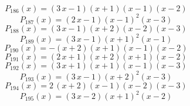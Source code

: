 \subitem \begin{dmath*}P_{186}(x) = {\left(3 \, x - 1\right)} {\left(x + 1\right)} {\left(x - 1\right)} {\left(x - 2\right)} \end{dmath*}\vspace{-1.2cm}
\subitem \begin{dmath*}P_{187}(x) = {\left(2 \, x - 1\right)} {\left(x - 1\right)}^{2} {\left(x - 3\right)} \end{dmath*}\vspace{-1.2cm}
\subitem \begin{dmath*}P_{188}(x) = {\left(3 \, x - 1\right)} {\left(x + 2\right)} {\left(x - 2\right)} {\left(x - 3\right)} \end{dmath*}\vspace{-1.2cm}
\subitem \begin{dmath*}P_{189}(x) = {\left(3 \, x - 1\right)} {\left(x + 1\right)}^{2} {\left(x - 1\right)} \end{dmath*}\vspace{-1.2cm}
\subitem \begin{dmath*}P_{190}(x) = -{\left(x + 2\right)} {\left(x + 1\right)} {\left(x - 1\right)} {\left(x - 2\right)} \end{dmath*}\vspace{-1.2cm}
\subitem \begin{dmath*}P_{191}(x) = {\left(2 \, x + 1\right)} {\left(x + 2\right)} {\left(x + 1\right)} {\left(x - 2\right)} \end{dmath*}\vspace{-1.2cm}
\subitem \begin{dmath*}P_{192}(x) = {\left(3 \, x + 1\right)} {\left(x + 1\right)} {\left(x - 1\right)} {\left(x - 3\right)} \end{dmath*}\vspace{-1.2cm}
\subitem \begin{dmath*}P_{193}(x) = {\left(3 \, x - 1\right)} {\left(x + 2\right)}^{2} {\left(x - 3\right)} \end{dmath*}\vspace{-1.2cm}
\subitem \begin{dmath*}P_{194}(x) = 2 \, {\left(x + 2\right)} {\left(x - 1\right)} {\left(x - 2\right)} {\left(x - 3\right)} \end{dmath*}\vspace{-1.2cm}
\subitem \begin{dmath*}P_{195}(x) = {\left(3 \, x - 2\right)} {\left(x + 1\right)}^{2} {\left(x - 2\right)} \end{dmath*}\vspace{-1.2cm}
